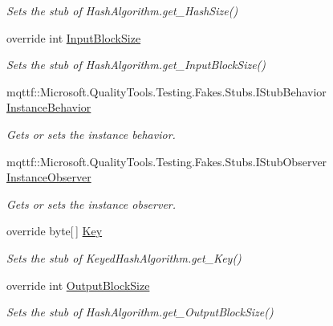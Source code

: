 \begin{DoxyCompactItemize}
\begin{DoxyCompactList}\small\item\em Sets the stub of Hash\-Algorithm.\-get\-\_\-\-Hash\-Size()\end{DoxyCompactList}\item 
override int \hyperlink{class_system_1_1_security_1_1_cryptography_1_1_fakes_1_1_stub_keyed_hash_algorithm_a89cf391675c29105d395746c5154cba3}{Input\-Block\-Size}
\begin{DoxyCompactList}\small\item\em Sets the stub of Hash\-Algorithm.\-get\-\_\-\-Input\-Block\-Size()\end{DoxyCompactList}\item 
mqttf\-::\-Microsoft.\-Quality\-Tools.\-Testing.\-Fakes.\-Stubs.\-I\-Stub\-Behavior \hyperlink{class_system_1_1_security_1_1_cryptography_1_1_fakes_1_1_stub_keyed_hash_algorithm_af6fe1ed06f0676058b2d75405dd5e93b}{Instance\-Behavior}
\begin{DoxyCompactList}\small\item\em Gets or sets the instance behavior.\end{DoxyCompactList}\item 
mqttf\-::\-Microsoft.\-Quality\-Tools.\-Testing.\-Fakes.\-Stubs.\-I\-Stub\-Observer \hyperlink{class_system_1_1_security_1_1_cryptography_1_1_fakes_1_1_stub_keyed_hash_algorithm_a67c950120fe44684ed7b1400f4188b85}{Instance\-Observer}
\begin{DoxyCompactList}\small\item\em Gets or sets the instance observer.\end{DoxyCompactList}\item 
override byte\mbox{[}$\,$\mbox{]} \hyperlink{class_system_1_1_security_1_1_cryptography_1_1_fakes_1_1_stub_keyed_hash_algorithm_a9ac3758e81e65a76ed9b2d4e66018508}{Key}
\begin{DoxyCompactList}\small\item\em Sets the stub of Keyed\-Hash\-Algorithm.\-get\-\_\-\-Key()\end{DoxyCompactList}\item 
override int \hyperlink{class_system_1_1_security_1_1_cryptography_1_1_fakes_1_1_stub_keyed_hash_algorithm_a4958a34494a542e429ccf8201d2bbc47}{Output\-Block\-Size}
\begin{DoxyCompactList}\small\item\em Sets the stub of Hash\-Algorithm.\-get\-\_\-\-Output\-Block\-Size()\end{DoxyCompactList}\end{DoxyCompactItemize}


